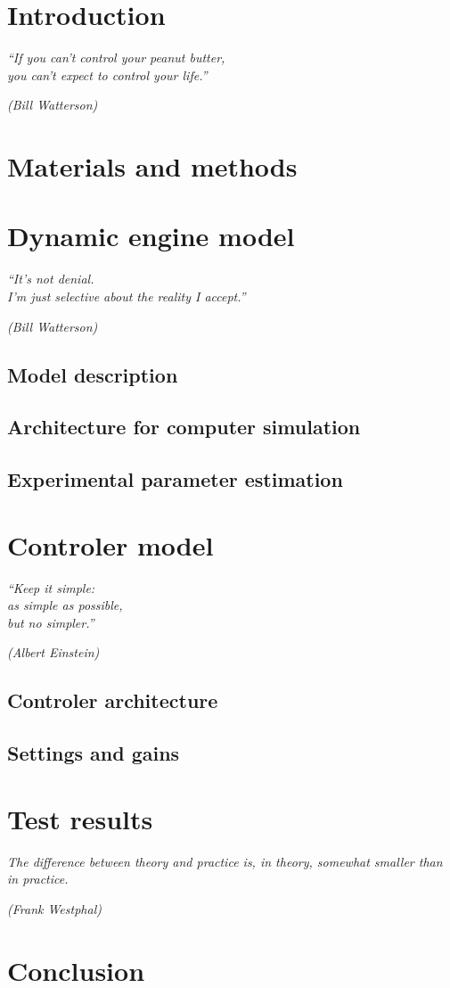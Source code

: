 \textual

\chapter{Introduction}
\epigraph{\em ``If you can't control your peanut butter,\\ you can't expect to
control your life.''}{\em(Bill Watterson)}

\chapter{Materials and methods}

\chapter{Dynamic engine model}
\epigraph{\em ``It's not denial.\\ I'm just selective about the reality I
accept.''}{\em(Bill Watterson)}
\section{Model description}
\section{Architecture for computer simulation}
\section{Experimental parameter estimation}

\chapter{Controler model}
\epigraph{\em ``Keep it simple:\\
as simple as possible,\\
but no simpler.''}{\em (Albert Einstein)}
\section{Controler architecture}
\section{Settings and gains}

\chapter{Test results}
\epigraph{\em The difference between theory and practice is, in theory, somewhat
smaller than in practice.}{\em (Frank Westphal)}

\chapter{Conclusion}
